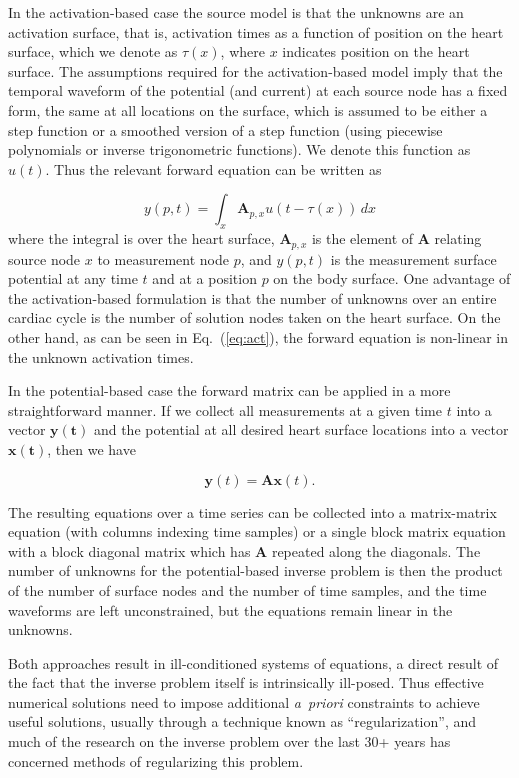 In the activation-based case the source model is that the unknowns are an
activation surface, that is, activation times as a function of position on
the heart surface, which we denote as $\tau(x)$, where $x$ indicates
position on the heart surface. The assumptions required for the
activation-based model imply that the temporal waveform of the potential
(and current) at each source node has a fixed form, the same at all
locations on the surface, which is assumed to be
either a step function or a smoothed version of a step function (using
piecewise polynomials or inverse trigonometric functions). We denote this
function as $u(t)$. Thus the relevant forward equation can be written as

\[ y(p,t) = \int_{x} \mathbf{A}_{p,x}u(t-\tau(x))\,dx \label{eq:act} \]
where the integral is over the heart surface, $\mathbf{A}_{p,x}$ is the
element of $\mathbf{A}$ relating source node $x$ to measurement node $p$,
and $y(p,t)$ is the measurement surface potential at any time $t$ and at a
position $p$ on the body surface. One advantage of the activation-based
formulation is that the number of unknowns over an entire cardiac cycle is
the number of solution nodes taken on the heart surface. On the other hand,
as can be seen in Eq.~(\ref{eq:act}), the forward equation is non-linear in
the unknown activation times.

In the potential-based case the forward matrix can be applied in a more
straightforward manner. If we collect all measurements at a given time $t$ into
a vector $\mathbf{y(t)}$ and the potential at all desired heart surface locations
into a vector $\mathbf{x(t)}$, then we have 

\[ \mathbf{y}(t) = \mathbf{A}\mathbf{x}(t).
\]

The resulting equations over a time series can be collected into a
matrix-matrix equation (with columns indexing time samples) or a single
block matrix equation with a block diagonal matrix which has $\mathbf{A}$
repeated along the diagonals. The number of unknowns for the potential-based
inverse problem is then the product of the number of surface nodes and the
number of time samples, and the time waveforms are left unconstrained, but
the equations remain linear in the unknowns.

Both approaches result in ill-conditioned systems of equations, a direct
result of the fact that the inverse problem itself is intrinsically
ill-posed. Thus effective numerical solutions need to impose additional
\textit{a~priori} constraints to achieve useful solutions, usually through
a technique known as ``regularization'', and much of the research on the
inverse problem over the last 30+ years has concerned methods of
regularizing this problem.

